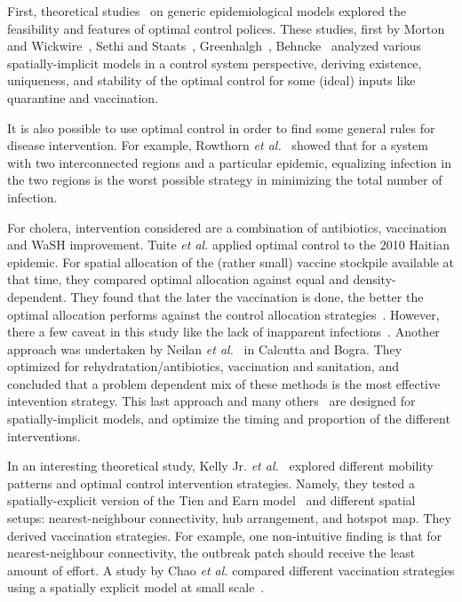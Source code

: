 First, theoretical studies~\cite{kar_stability_2011, laguzet_global_2015} on  generic epidemiological models explored the feasibility and features of optimal control polices. These studies, first by Morton and Wickwire~\cite{morton_optimal_1974}, Sethi and Staats~\cite{sethi_optimal_1978}, Greenhalgh~\cite{greenhalgh_results_1988}, Behncke~\cite{behncke_optimal_2001} analyzed  various spatially-implicit models in a control system perspective, deriving existence, uniqueness, and stability of the optimal control for some (ideal) inputs like quarantine and vaccination.

It is also possible to use optimal control in order to find some general rules for disease intervention. For example, Rowthorn \textit{et al.}~\cite{rowthorn_optimal_2009} showed that for a system with two interconnected regions and a particular epidemic, equalizing infection in the two regions is the worst possible strategy in minimizing the total number of infection.

For cholera, intervention considered are a combination of antibiotics, vaccination and WaSH improvement. Tuite \textit{et al.} applied optimal control to the 2010 Haitian epidemic. For spatial allocation of the (rather small) vaccine stockpile available at that time, they compared optimal allocation against equal and density-dependent. They found that the later the vaccination is done, the better the optimal allocation performs against the control allocation strategies~\cite{tuite_cholera_2011}. However, there a few caveat in this study like the lack of inapparent infections~\cite{king_inapparent_2008, rinaldo_reassessment_2012}. Another approach was undertaken by Neilan \textit{et al.}~\cite{millerneilan_modeling_2010} in Calcutta and Bogra. They optimized for rehydratation/antibiotics, vaccination and sanitation, and concluded that a problem dependent mix of these methods is the most effective intevention strategy. This last approach and many others~\cite{sardar_optimal_2013} are designed for spatially-implicit models, and optimize the timing and proportion of the different interventions.

In an interesting theoretical study, Kelly Jr. \textit{et al.}~\cite{kelly_impact_2016} explored different mobility patterns and  optimal control intervention strategies. Namely, they tested a spatially-explicit version of the Tien and Earn model~\cite{tien_multiple_2010} and different spatial setups: nearest-neighbour connectivity, hub arrangement, and  hotspot map. They derived vaccination strategies. For example, one non-intuitive finding is that for nearest-neighbour connectivity, the outbreak patch should receive the least amount of effort.  A study by Chao \textit{et al.} compared different vaccination strategies using a spatially explicit model at small scale~\cite{chao_vaccination_2011}.  

